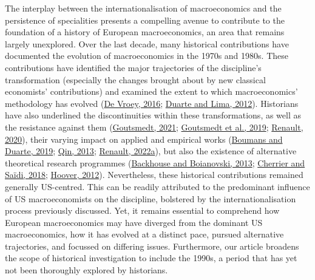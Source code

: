 \documentclass[
  12pt,
  onecolumn]{article}
\begin{document}
The interplay between the internationalisation of macroeconomics and the
persistence of specialities presents a compelling avenue to contribute
to the foundation of a history of European macroeconomics, an area that
remains largely unexplored. Over the last decade, many historical
contributions have documented the evolution of macroeconomics in the
1970s and 1980s. These contributions have identified the major
trajectories of the discipline's transformation (especially the changes
brought about by new classical economists' contributions) and examined
the extent to which macroeconomics' methodology has evolved
(\protect\hyperlink{ref-devroey2016}{De Vroey, 2016};
\protect\hyperlink{ref-duartelima2012a}{Duarte and Lima, 2012}).
Historians have also underlined the discontinuities within these
transformations, as well as the resistance against them
(\protect\hyperlink{ref-goutsmedt2021b}{Goutsmedt, 2021};
\protect\hyperlink{ref-goutsmedtetal2019}{Goutsmedt et al., 2019};
\protect\hyperlink{ref-renault2020a}{Renault, 2020}), their varying
impact on applied and empirical works
(\protect\hyperlink{ref-boumans2019}{Boumans and Duarte, 2019};
\protect\hyperlink{ref-qin2013a}{Qin, 2013};
\protect\hyperlink{ref-renault2022}{Renault, 2022a}), but also the
existence of alternative theoretical research programmes
(\protect\hyperlink{ref-backhouseboianovski2013}{Backhouse and
Boianovski, 2013}; \protect\hyperlink{ref-cherrier2018c}{Cherrier and
Saïdi, 2018}; \protect\hyperlink{ref-hoover2012}{Hoover, 2012}).
Nevertheless, these historical contributions remained generally
US-centred. This can be readily attributed to the predominant influence
of US macroeconomists on the discipline, bolstered by the
internationalisation process previously discussed. Yet, it remains
essential to comprehend how European macroeconomics may have diverged
from the dominant US macroeconomics, how it has evolved at a distinct
pace, pursued alternative trajectories, and focussed on differing
issues. Furthermore, our article broadens the scope of historical
investigation to include the 1990s, a period that has yet not been
thoroughly explored by historians.
\end{document}
